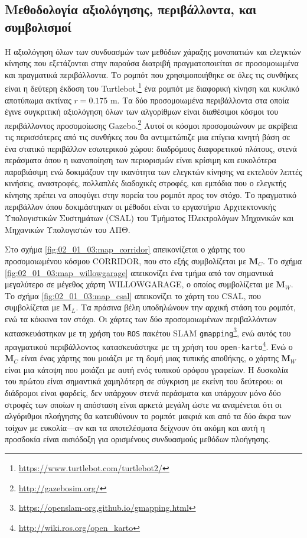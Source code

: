 \subsection{Μεθοδολογία αξιολόγησης, περιβάλλοντα, και συμβολισμοί}
\label{subsection:02_01_03:01}

Η αξιολόγηση όλων των συνδυασμών των μεθόδων χάραξης μονοπατιών και ελεγκτών
κίνησης που εξετάζονται στην παρούσα διατριβή πραγματοποιείται σε προσομοιωμένα
και πραγματικά περιβάλλοντα. Το ρομπότ που χρησιμοποιήθηκε σε όλες τις συνθήκες
είναι η δεύτερη έκδοση του
Turtlebot,\footnote{\url{https://www.turtlebot.com/turtlebot2/}} ένα ρομπότ με
διαφορική κίνηση και κυκλικό αποτύπωμα ακτίνας $r=0.175$ m. Τα δύο
προσομοιωμένα περιβάλλοντα στα οποία έγινε συγκριτική αξιολόγηση όλων των
αλγορίθμων είναι διαθέσιμοι κόσμοι του περιβάλλοντος προσομοίωσης
Gazebo.\footnote{\url{http://gazebosim.org/}} Αυτοί οι κόσμοι προσομοιώνουν με
ακρίβεια τις περισσότερες από τις συνθήκες που θα αντιμετώπιζε μια επίγεια
κινητή βάση σε ένα στατικό περιβάλλον εσωτερικού χώρου: διαδρόμους διαφορετικού
πλάτους, στενά περάσματα όπου η ικανοποίηση των περιορισμών είναι κρίσιμη και
ευκολότερα παραβιάσιμη ενώ δοκιμάζουν την ικανότητα των ελεγκτών κίνησης να
εκτελούν λεπτές κινήσεις, αναστροφές, πολλαπλές διαδοχικές στροφές, και εμπόδια
που ο ελεγκτής κίνησης πρέπει να αποφύγει στην πορεία του ρομπότ προς
τον στόχο. Το πραγματικό περιβάλλον όπου δοκιμάστηκαν οι μέθοδοι είναι το
εργαστήριο Αρχιτεκτονικής Υπολογιστικών Συστημάτων (CSAL) του Τμήματος
Ηλεκτρολόγων Μηχανικών και Μηχανικών Υπολογιστών του ΑΠΘ.

Στο σχήμα \ref{fig:02_01_03:map_corridor} απεικονίζεται ο χάρτης του
προσομοιωμένου κόσμου CORRIDOR, που στο εξής συμβολίζεται με $\bm{M}_C$. Το
σχήμα \ref{fig:02_01_03:map_willowgarage} απεικονίζει ένα τμήμα από τον
σημαντικά μεγαλύτερο σε μέγεθος χάρτη WILLOWGARAGE, ο οποίος συμβολίζεται με
$\bm{M}_W$. Το σχήμα \ref{fig:02_01_03:map_csal} απεικονίζει το χάρτη του CSAL,
που συμβολίζεται με $\bm{M}_L$.  Τα πράσινα βέλη υποδηλώνουν την αρχική στάση
του ρομπότ, ενώ τα κόκκινα τον στόχο. Οι χάρτες των δύο προσομοιωμένων
περιβαλλόντων κατασκευάστηκαν με τη χρήση του \texttt{ROS} πακέτου SLAM
\texttt{gmapping}\footnote{\url{https://openslam-org.github.io/gmapping.html}},
ενώ αυτός του πραγματικού περιβάλλοντος κατασκευάστηκε με τη χρήση του
\texttt{open-karto}\footnote{\url{http://wiki.ros.org/open\_karto}}. Ενώ ο
$\bm{M}_C$ είναι ένας χάρτης που μοιάζει με τη δομή μιας τυπικής αποθήκης, ο
χάρτης $\bm{M}_W$ είναι μια κάτοψη που μοιάζει με αυτή ενός τυπικού ορόφου
γραφείων. Η δυσκολία του πρώτου είναι σημαντικά χαμηλότερη σε σύγκριση με
εκείνη του δεύτερου: οι διάδρομοι είναι φαρδείς, δεν υπάρχουν στενά περάσματα
και υπάρχουν μόνο δύο στροφές των οποίων η απόσταση είναι αρκετά μεγάλη ώστε να
αναμένεται ότι οι αλγόριθμοι πλοήγησης θα κατευθύνουν το ρομπότ μακριά και από
τα δύο άκρα των τοίχων με ευκολία---αν και τα αποτελέσματα δείχνουν ότι ακόμη
και αυτή η προσδοκία είναι αισιόδοξη για ορισμένους συνδυασμούς μεθόδων
πλοήγησης.

